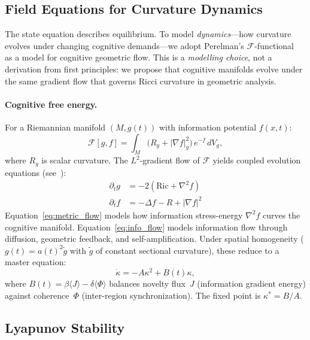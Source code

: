 \documentclass[letterpaper]{article}
\begin{document}
\subsection{Field Equations for Curvature Dynamics}
\label{sec:field}

The state equation describes equilibrium.
To model \emph{dynamics}---how curvature evolves under
changing cognitive demands---we adopt Perelman's
$\mathcal{F}$-functional~\citep{perelman2002} as a
model for cognitive geometric flow.
This is a \emph{modelling choice}, not a derivation
from first principles: we propose that cognitive
manifolds evolve under the same gradient flow that
governs Ricci curvature in geometric analysis.

\paragraph{Cognitive free energy.}
For a Riemannian manifold $(M,g(t))$ with information
potential $f(x,t)$:
\begin{equation}\label{eq:free_energy}
  \mathcal{F}[g,f] = \int_M
  \bigl(R_g + |\nabla f|^2_g\bigr)\,
  e^{-f}\,dV_g,
\end{equation}
where $R_g$ is scalar curvature.
The $L^2$-gradient flow of $\mathcal{F}$ yields coupled
evolution equations (see~\citet{perelman2002}):
\begin{align}
  \partial_t g &= -2(\mathrm{Ric} + \nabla^2 f)
    \label{eq:metric_flow} \\
  \partial_t f &= -\Delta f - R + |\nabla f|^2
    \label{eq:info_flow}
\end{align}
Equation~\eqref{eq:metric_flow} models how information
stress-energy $\nabla^2 f$ curves the cognitive
manifold.
Equation~\eqref{eq:info_flow} models information flow
through diffusion, geometric feedback, and
self-amplification.
Under spatial homogeneity
($g(t)=a(t)^2\tilde{g}$ with $\tilde{g}$ of constant
sectional curvature), these reduce to a master equation:
\begin{equation}\label{eq:master}
  \dot{\kappa} = -A\kappa^2 + B(t)\kappa,
\end{equation}
where $B(t)=\beta\langle J\rangle
-\delta\langle\Phi\rangle$ balances novelty flux~$J$
(information gradient energy) against
coherence~$\Phi$ (inter-region synchronization).
The fixed point is $\kappa^*=B/A$.

\subsection{Lyapunov Stability}
\end{document}
